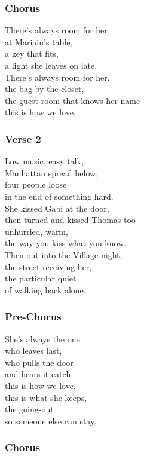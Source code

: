 \subsubsection{Chorus}\label{chorus-65}

There's always room for her\\
at Mariain's table,\\
a key that fits,\\
a light she leaves on late.\\
There's always room for her,\\
the bag by the closet,\\
the guest room that knows her name ---\\
this is how we love.

\subsubsection{Verse 2}\label{verse-2-26}

Low music, easy talk,\\
Manhattan spread below,\\
four people loose\\
in the end of something hard.\\
She kissed Gabi at the door,\\
then turned and kissed Thomas too ---\\
unhurried, warm,\\
the way you kiss what you know.\\
Then out into the Village night,\\
the street receiving her,\\
the particular quiet\\
of walking back alone.

\subsubsection{Pre-Chorus}\label{pre-chorus-45}

She's always the one\\
who leaves last,\\
who pulls the door\\
and hears it catch ---\\
this is how we love,\\
this is what she keeps,\\
the going-out\\
so someone else can stay.

\subsubsection{Chorus}\label{chorus-66}

